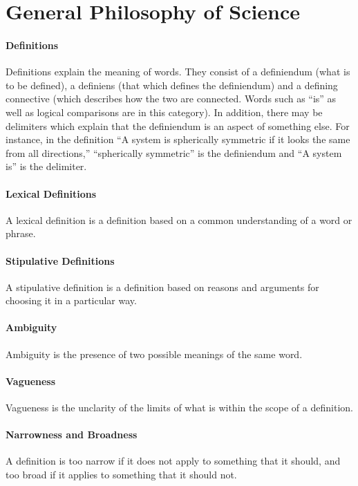 \section{General Philosophy of Science}

\paragraph{Definitions}
Definitions explain the meaning of words. They consist of a definiendum (what is to be defined), a definiens (that which defines the definiendum) and a defining connective (which describes how the two are connected. Words such as ``is'' as well as logical comparisons are in this category). In addition, there may be delimiters which explain that the definiendum is an aspect of something else. For instance, in the definition ``A system is spherically symmetric if it looks the same from all directions,'' ``spherically symmetric'' is the definiendum and ``A system is'' is the delimiter.

\paragraph{Lexical Definitions}
A lexical definition is a definition based on a common understanding of a word or phrase.

\paragraph{Stipulative Definitions}
A stipulative definition is a definition based on reasons and arguments for choosing it in a particular way.

\paragraph{Ambiguity}
Ambiguity is the presence of two possible meanings of the same word.

\paragraph{Vagueness}
Vagueness is the unclarity of the limits of what is within the scope of a definition.

\paragraph{Narrowness and Broadness}
A definition is too narrow if it does not apply to something that it should, and too broad if it applies to something that it should not.

